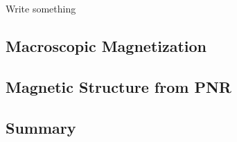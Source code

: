 \documentclass[\main/dresen_thesis.tex]{subfiles}
\renewcommand{\thisPath}{\main/chapters/doublelayers/magnetism}
\begin{document}
  Write something
  

  \subsection{Macroscopic Magnetization}
  
    \FloatBarrier

  \subsection{Magnetic Structure from PNR}
  
    \FloatBarrier

  \subsection{Summary}
  
    \FloatBarrier
\end{document}
